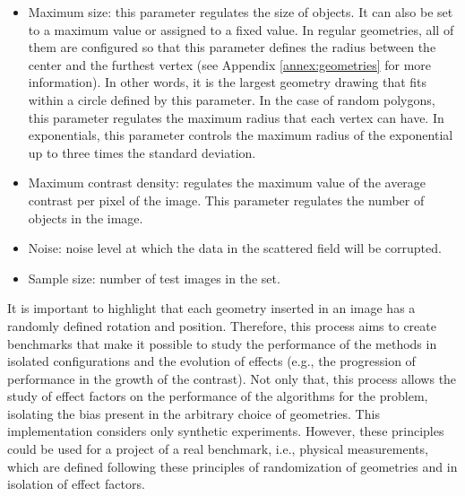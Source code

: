 \begin{itemize}
					\item Maximum size: this parameter regulates the size of objects. It can also be set to a maximum value or assigned to a fixed value. In regular geometries, all of them are configured so that this parameter defines the radius between the center and the furthest vertex (see Appendix \ref{annex:geometries} for more information). In other words, it is the largest geometry drawing that fits within a circle defined by this parameter. In the case of random polygons, this parameter regulates the maximum radius that each vertex can have. In exponentials, this parameter controls the maximum radius of the exponential up to three times the standard deviation.
					\item Maximum contrast density: regulates the maximum value of the average contrast per pixel of the image. This parameter regulates the number of objects in the image.
					\item Noise: noise level at which the data in the scattered field will be corrupted.
					\item Sample size: number of test images in the set.
				\end{itemize}
				It is important to highlight that each geometry inserted in an image has a randomly defined rotation and position. Therefore, this process aims to create benchmarks that make it possible to study the performance of the methods in isolated configurations and the evolution of effects (e.g., the progression of performance in the growth of the contrast). Not only that, this process allows the study of effect factors on the performance of the algorithms for the problem, isolating the bias present in the arbitrary choice of geometries. This implementation considers only synthetic experiments. However, these principles could be used for a project of a real benchmark, i.e., physical measurements, which are defined following these principles of randomization of geometries and in isolation of effect factors.

